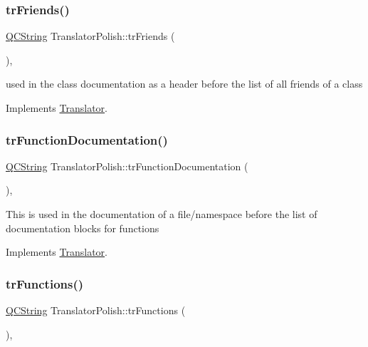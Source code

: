 \subsubsection{\texorpdfstring{trFriends()}{trFriends()}}
{\footnotesize\ttfamily \mbox{\hyperlink{class_q_c_string}{Q\+C\+String}} Translator\+Polish\+::tr\+Friends (\begin{DoxyParamCaption}{ }\end{DoxyParamCaption})\hspace{0.3cm}{\ttfamily [inline]}, {\ttfamily [virtual]}}

used in the class documentation as a header before the list of all friends of a class 

Implements \mbox{\hyperlink{class_translator}{Translator}}.

\mbox{\label{class_translator_polish_a188cef323586d441f24e08219f6e91ef}} 
\subsubsection{\texorpdfstring{trFunctionDocumentation()}{trFunctionDocumentation()}}
{\footnotesize\ttfamily \mbox{\hyperlink{class_q_c_string}{Q\+C\+String}} Translator\+Polish\+::tr\+Function\+Documentation (\begin{DoxyParamCaption}{ }\end{DoxyParamCaption})\hspace{0.3cm}{\ttfamily [inline]}, {\ttfamily [virtual]}}

This is used in the documentation of a file/namespace before the list of documentation blocks for functions 

Implements \mbox{\hyperlink{class_translator}{Translator}}.

\mbox{\label{class_translator_polish_a8648a7b233ad0a4735508a56778183df}} 
\subsubsection{\texorpdfstring{trFunctions()}{trFunctions()}}
{\footnotesize\ttfamily \mbox{\hyperlink{class_q_c_string}{Q\+C\+String}} Translator\+Polish\+::tr\+Functions (\begin{DoxyParamCaption}{ }\end{DoxyParamCaption})\hspace{0.3cm}{\ttfamily [inline]}, {\ttfamily [virtual]}}

